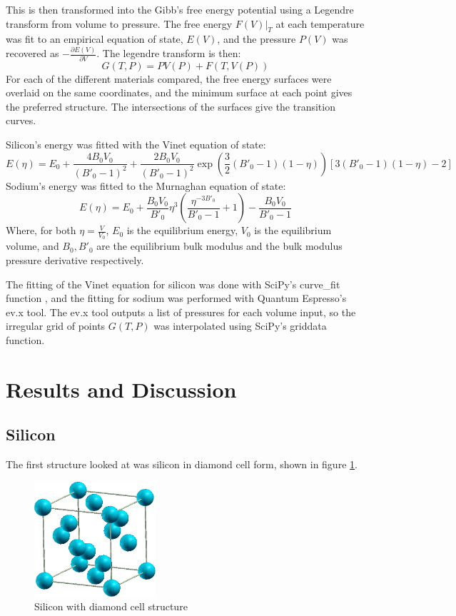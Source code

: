 \documentclass[12pt]{article}
\begin{document}
This is then transformed into the Gibb's free energy potential using a Legendre transform from volume to pressure. The free energy $F(V)|_T$ at each temperature was fit to an empirical equation of state, $E(V)$, and the pressure $P(V)$ was recovered as $-\frac{\partial E(V)}{\partial V}$. The legendre transform is then:
\begin{equation}
	G(T, P) = PV(P) + F(T, V(P))
\end{equation}
For each of the different materials compared, the free energy surfaces were overlaid on the same coordinates, and the minimum surface at each point gives the preferred structure. The intersections of the surfaces give the transition curves.

Silicon's energy was fitted with the Vinet equation of state:
\begin{equation}\label{eq:vinet}
E(\eta) = E_0 + \frac{4B_0V_0}{(B'_0-1)^2} + \frac{2B_0V_0}{(B'_0-1)^2}\exp{\left(\frac{3}{2}(B'_0-1)(1-\eta)\right)}[3(B'_0-1)(1-\eta)-2]
\end{equation}
Sodium's energy was fitted to the Murnaghan equation of state:
\begin{equation}\label{eq:bm}
E(\eta) = E_0+\frac{B_0V_0}{B'_0}\eta^3\left( \frac{\eta^{-3B'_0}}{B'_0-1}+1\right)-\frac{B_0V_0}{B'_0-1}
\end{equation}
Where, for both $\eta=\frac{V}{V_0}$, $E_0$ is the equilibrium energy, $V_0$ is the equilibrium volume, and $B_0, B'_0$ are the equilibrium bulk modulus and the bulk modulus pressure derivative respectively.

The fitting of the Vinet equation for silicon was done with SciPy's curve\_fit function \cite{scipy}, and the fitting for sodium was performed with Quantum Espresso's ev.x tool. The ev.x tool outputs a list of pressures for each volume input, so the irregular grid of points $G(T, P)$ was interpolated using SciPy's griddata function.
\section{Results and Discussion}
\subsection{Silicon}

The first structure looked at was silicon in diamond cell form, shown in figure \ref{fig:siliconstructure}.

\begin{figure}
	\centering
	\includegraphics[width=0.4\textwidth]{figures/sidiamond.png}
	\caption{Silicon with diamond cell structure}
	\label{fig:siliconstructure}
\end{figure}
\end{document}
